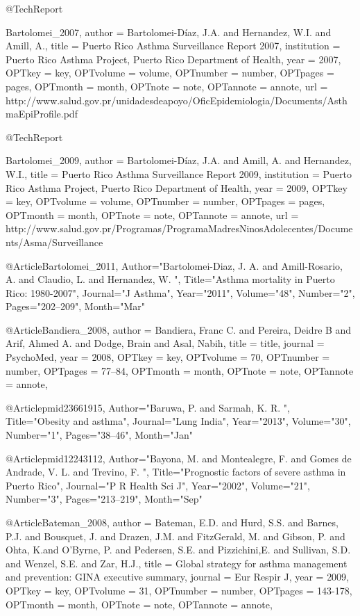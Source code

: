 @TechReport{Bartolomei_2007,
author = {Bartolomei-Díaz, J.A. and Hernandez, W.I. and Amill, A.},
title = {Puerto Rico Asthma Surveillance Report 2007},
institution = {Puerto Rico Asthma Project, Puerto Rico Department of Health},
year = {2007},
OPTkey = {key},
OPTvolume = {volume},
OPTnumber = {number},
OPTpages = {pages},
OPTmonth = {month},
OPTnote = {note},
OPTannote = {annote},
url = {http://www.salud.gov.pr/unidadesdeapoyo/OficEpidemiologia/Documents/AsthmaEpiProfile.pdf}

@TechReport{Bartolomei_2009,
author = {Bartolomei-Díaz, J.A. and Amill, A. and Hernandez, W.I.},
title = {Puerto Rico Asthma Surveillance Report 2009},
institution = {Puerto Rico Asthma Project, Puerto Rico Department of Health},
year = {2009},
OPTkey = {key},
OPTvolume = {volume},
OPTnumber = {number},
OPTpages = {pages},
OPTmonth = {month},
OPTnote = {note},
OPTannote = {annote},
url = {http://www.salud.gov.pr/Programas/ProgramaMadresNinosAdolecentes/Documents/Asma/Surveillance%
}

@Article{Bartolomei_2011,
   Author="Bartolomei-Diaz, J. A.  and Amill-Rosario, A.  and Claudio, L.  and Hernandez, W. ",
   Title="{{A}sthma mortality in {P}uerto {R}ico: 1980-2007}",
   Journal="J Asthma",
   Year="2011",
   Volume="48",
   Number="2",
   Pages="202--209",
   Month="Mar"
}


@Article{Bandiera_2008,
author = {Bandiera, Franc C. and Pereira, Deidre B and Arif, Ahmed A. and Dodge, Brain and Asal, Nabih},
title = {title},
journal = {PsychoMed},
year = {2008},
OPTkey = {key},
OPTvolume = {70},
OPTnumber = {number},
OPTpages = {77–84},
OPTmonth = {month},
OPTnote = {note},
OPTannote = {annote},
}

@Article{pmid23661915,
   Author="Baruwa, P.  and Sarmah, K. R. ",
   Title="{{O}besity and asthma}",
   Journal="Lung India",
   Year="2013",
   Volume="30",
   Number="1",
   Pages="38--46",
   Month="Jan"
}

@Article{pmid12243112,
   Author="Bayona, M.  and Montealegre, F.  and Gomes de Andrade, V. L.  and Trevino, F. ",
   Title="{{P}rognostic factors of severe asthma in {P}uerto {R}ico}",
   Journal="P R Health Sci J",
   Year="2002",
   Volume="21",
   Number="3",
   Pages="213--219",
   Month="Sep"
}

@Article{Bateman_2008,
author = {Bateman, E.D. and Hurd, S.S.  and 
 Barnes, P.J. and Bousquet, J. and 
 Drazen, J.M. and FitzGerald, M. and 
 Gibson, P. and Ohta, K.and
 O’Byrne, P. and Pedersen, S.E. and
  Pizzichini,E. and  Sullivan, S.D. and
 Wenzel, S.E. and Zar, H.J.},
title = {Global strategy for asthma management
and prevention: GINA executive summary},
journal = {Eur Respir J},
year = {2009},
OPTkey = {key},
OPTvolume = {31},
OPTnumber = {number},
OPTpages = {143-178},
OPTmonth = {month},
OPTnote = {note},
OPTannote = {annote},
}

}}
